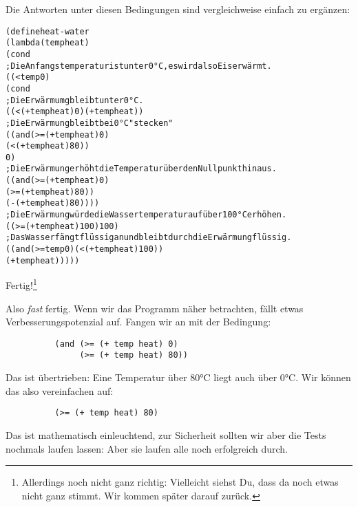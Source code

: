 %
Die Antworten unter diesen Bedingungen sind vergleichweise einfach zu
ergänzen:
%
\begin{alltt}
(define heat-water
  (lambda (temp heat)
    (cond
      ; Die Anfangstemperatur ist unter 0°C, es wird also Eis erwärmt.
      ((< temp 0)
       (cond
         ; Die Erwärmumg bleibt unter 0°C.
         ((< (+ temp heat) 0) (+ temp heat))
         ; Die Erwärmung bleibt bei  0°C "stecken"
         ((and (>= (+ temp heat) 0)
               (< (+ temp heat) 80))
          0)
         ; Die Erwärmung erhöht die Temperatur über den Nullpunkt hinaus.
         ((and (>= (+ temp heat) 0)
               (>= (+ temp heat) 80))
          (- (+ temp heat) 80))))
      ; Die Erwärmung würde die Wassertemperatur auf über 100°C erhöhen.
      ((>= (+ temp heat) 100) 100)
      ; Das Wasser fängt flüssig an und bleibt durch die Erwärmung flüssig.
      ((and (>= temp 0) (< (+ temp heat) 100))
       (+ temp heat)))))
\end{alltt}
%
Fertig!\footnote{Allerdings noch nicht ganz richtig: Vielleicht siehst Du,
  dass da noch etwas nicht ganz stimmt.  Wir kommen später darauf zurück.}

\medskip

Also \emph{fast} fertig.  Wenn wir das Programm näher betrachten,
fällt etwas Verbesserungspotenzial auf.  Fangen wir an mit der
Bedingung:
%
\begin{verbatim}
          (and (>= (+ temp heat) 0)
               (>= (+ temp heat) 80))
\end{verbatim}
%
Das ist übertrieben: Eine Temperatur über 80°C liegt auch über 0°C.
Wir können das also vereinfachen auf:
%
\begin{verbatim}
          (>= (+ temp heat) 80)
\end{verbatim}
%
Das ist mathematisch einleuchtend, zur Sicherheit sollten wir aber die
Tests nochmals laufen lassen: Aber sie laufen alle noch erfolgreich
durch.

